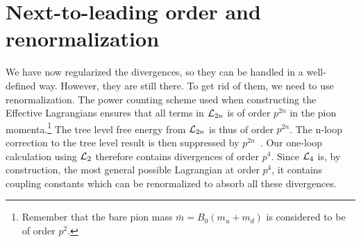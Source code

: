 \section{Next-to-leading order and renormalization}
We have now regularized the divergences, so they can be handled in a well-defined way.
However, they are still there.
To get rid of them, we need to use renormalization.
The power counting scheme used when constructing the Effective Lagrangians ensures that all terms in $\mathcal{L}_{2n}$ is of order $p^{2n}$ in the pion momenta.\footnote{Remember that the bare pion mass $\bar m = B_0(m_u + m_d)$ is considered to be of order $p^2$.}
The tree level free energy from $\mathcal{L}_{2n}$ is thus of order $p^{2n}$.
The n-loop correction to the tree level result is then suppressed by $p^{2n}$~\cite{Gasser-Leutwyler:chiral,WeinbergPhenom}.
Our one-loop calculation using $\mathcal{L}_2$ therefore contains divergences of order $p^{4}$. 
Since $\mathcal{L}_4$ is, by construction, the most general possible Lagrangian at order $p^4$, it contains coupling constants which can be renormalized to absorb all these divergences.

